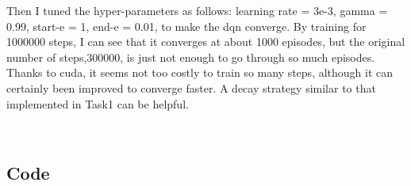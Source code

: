 \documentclass[aps,letterpaper,10pt]{revtex4}
\begin{document}
Then I tuned the  hyper-parameters as follows: learning rate = 3e-3, gamma = 0.99, start-e = 1, end-e = 0.01, to make the dqn converge. By training for 1000000 steps, I can see that it converges at about 1000 episodes, but the original number of steps,300000, is just not enough to go through so much episodes. Thanks to cuda, it seems not too costly to train so many steps, although it can certainly been improved to converge faster. A decay strategy similar to that implemented in Task1 can be helpful.

\begin{figure}[H]
	  \centering
	  \\
	  \caption{}
	  \label{fig:oscil}
	\end{figure}

\subsection{Code}
\vspace{5mm}
	
	\vspace{3mm}


\end{document}
